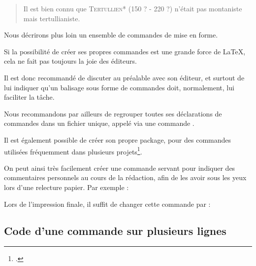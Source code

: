 \renewcommand{\auteur}[2]{\textsc{#1}* (#2)}

\begin{quotation}
Il est bien connu que \auteur{Tertullien}{150 ? - 220 ?}
n'était pas montaniste mais tertullianiste.
\end{quotation}

Nous décrirons plus loin un ensemble de commandes de mise en forme.

\begin{attention}
    Si la possibilité de créer ses propres commandes est une grande force de \LaTeX, cela ne fait pas toujours la joie des éditeurs. 
    
    Il est donc recommandé de discuter au préalable avec son éditeur, et surtout de lui indiquer qu'un balisage sous forme de commandes doit, normalement, lui faciliter la tâche.
    
    
    Nous recommandons par ailleurs de regrouper toutes ses déclarations de commandes dans un fichier unique, appelé via une commande .
    
    Il est également possible de créer son propre package, pour des commandes utilisées fréquemment dans plusieurs projets\footcite[Ceci dépasserait le cadre de cet ouvrage : je renvoie à d'autres documents. Par exemples][]{creer_sty}.
\end{attention}


\begin{plusloins}\label{commentaireredac}
On peut ainsi très facilement créer une commande  servant pour indiquer des commentaires personnels au cours de la rédaction, afin de les avoir sous les yeux lors d'une relecture papier.
Par exemple :

\begin{latexcode}
\newcommand{\commentaire}[1]{\marginpar{#1}}
\end{latexcode}

Lors de l'impression finale, il suffit de changer cette commande par :

\begin{latexcode}
\newcommand{\commentaire}[1]{}
\end{latexcode}
\end{plusloins}

\subsection{Code d'une commande sur plusieurs lignes}\label{commandepourcent}

